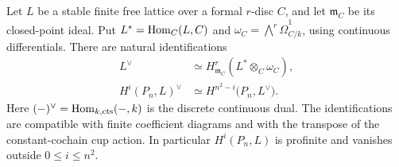 \begin{lemma}\label{lem:compact:duality}
Let $L$ be a stable finite free lattice over a formal $r$-disc $C$, and
let $\mathfrak m_C$ be its closed-point ideal.  Put
$L^*=\operatorname{Hom}_C(L,C)$ and
$\omega_C=\bigwedge^r\widehat\Omega^1_{C/k}$, using continuous
differentials.
There are natural identifications
\begin{align*}
 L^\vee&\simeq H^r_{\mathfrak m_C}(L^*\otimes_C\omega_C),\\
 H^i(P_n,L)^\vee
 &\simeq H^{n^2-i}\bigl(P_n,L^\vee\bigr).
\end{align*}
Here $(-)^\vee=\operatorname{Hom}_{k,\mathrm{cts}}(-,k)$ is the discrete continuous
dual.  The identifications are compatible with finite coefficient
diagrams and with the transpose of the constant-cochain cup action.
In particular $H^i(P_n,L)$ is profinite and vanishes outside
$0\leq i\leq n^2$.
\end{lemma}

